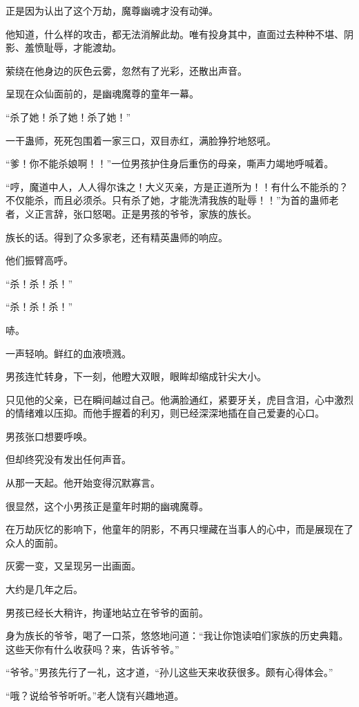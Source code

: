 \begin{this_body}
正是因为认出了这个万劫，魔尊幽魂才没有动弹。

他知道，什么样的攻击，都无法消解此劫。唯有投身其中，直面过去种种不堪、阴影、羞愤耻辱，才能渡劫。

萦绕在他身边的灰色云雾，忽然有了光彩，还散出声音。

呈现在众仙面前的，是幽魂魔尊的童年一幕。

“杀了她！杀了她！杀了她！”

一干蛊师，死死包围着一家三口，双目赤红，满脸狰狞地怒吼。

“爹！你不能杀娘啊！！”一位男孩护住身后重伤的母亲，嘶声力竭地呼喊着。

“哼，魔道中人，人人得尔诛之！大义灭亲，方是正道所为！！有什么不能杀的？不仅能杀，而且必须杀。只有杀了她，才能洗清我族的耻辱！！”为首的蛊师老者，义正言辞，张口怒喝。正是男孩的爷爷，家族的族长。

族长的话。得到了众多家老，还有精英蛊师的响应。

他们振臂高呼。

“杀！杀！杀！”

“杀！杀！杀！”

哧。

一声轻响。鲜红的血液喷溅。

男孩连忙转身，下一刻，他瞪大双眼，眼眸却缩成针尖大小。

只见他的父亲，已在瞬间越过自己。他满脸通红，紧要牙关，虎目含泪，心中激烈的情绪难以压抑。而他手握着的利刃，则已经深深地插在自己爱妻的心口。

男孩张口想要呼唤。

但却终究没有发出任何声音。

从那一天起。他开始变得沉默寡言。

很显然，这个小男孩正是童年时期的幽魂魔尊。

在万劫灰忆的影响下，他童年的阴影，不再只埋藏在当事人的心中，而是展现在了众人的面前。

灰雾一变，又呈现另一出画面。

大约是几年之后。

男孩已经长大稍许，拘谨地站立在爷爷的面前。

身为族长的爷爷，喝了一口茶，悠悠地问道：“我让你饱读咱们家族的历史典籍。这些天你有什么收获吗？来，告诉爷爷。”

“爷爷。”男孩先行了一礼，这才道，“孙儿这些天来收获很多。颇有心得体会。”

“哦？说给爷爷听听。”老人饶有兴趣地道。


\end{this_body}
